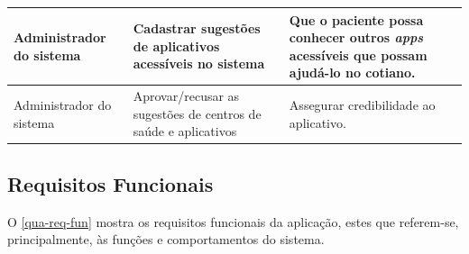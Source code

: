 \begin{quadro}[htb]
\begin{center}
\begin{tabular}{p{2.0cm}|p{5.0cm}|p{7.0cm}}
            \hline
            Administrador do sistema                                       &
            Cadastrar sugestões de aplicativos acessíveis no sistema       &
            Que o paciente possa conhecer outros \emph{apps} acessíveis que possam ajudá\@-lo no cotiano.                       \\
            \hline
            Administrador do sistema                                       &
            Aprovar/recusar as sugestões de centros de saúde e aplicativos &
            Assegurar credibilidade ao aplicativo.                                                                              \\
        \end{tabular}
    \end{center}
\end{quadro}

\newpage

\subsection{Requisitos Funcionais}

O \autoref{qua-req-fun} mostra os requisitos funcionais da aplicação, estes que referem-se, principalmente, às funções e 
comportamentos do sistema.


